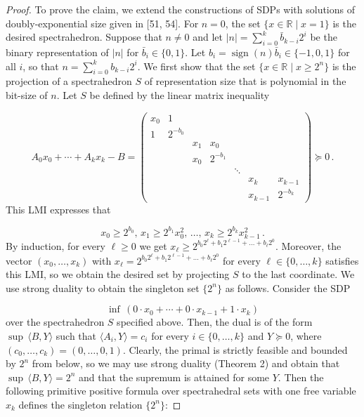\begin{proof}
To prove the claim, we extend the constructions of SDPs with solutions of doubly-exponential size given in [51, 54]. For $n=0$, the set $\{x\in\mathbb{R}\mid x=1\}$ is the desired spectrahedron. Suppose that $n\neq 0$ and let $|n|=\sum_{i=0}^{k}\bar{b}_{k-i}2^{i}$ be the binary representation of $|n|$ for $\bar{b}_{i}\in\{0,1\}$. Let $b_{i}=\operatorname*{\mathrm{sign}}(n)\bar{b}_{i}\in\{-1,0,1\}$ for all $i$, so that $n=\sum_{i=0}^{k}b_{k-i}2^{i}$. We first show that the set $\{x\in{\mathbb{R}}\mid x\geq 2^{n}\}$ is the projection of a spectrahedron $S$ of representation size that is polynomial in the bit-size of $n$. Let $S$ be defined by the linear matrix inequality


\[
\displaystyle A_{0}x_{0}+\cdots+A_{k}x_{k}-B=\begin{pmatrix}x_{0}&1&\\ 1&2^{-b_{0}}\\ &&x_{1}&x_{0}\\ &&x_{0}&2^{-b_{1}}\\ &&&&\ddots\\ &&&&&x_{k}&x_{k-1}\\ &&&&&x_{k-1}&2^{-b_{k}}\end{pmatrix}\succeq 0\,.
\]
This LMI expresses that


\[
x_{0}\geq 2^{b_{0}},\,x_{1}\geq 2^{b_{1}}x_{0}^{2},\,\dots,\,x_{k}\geq 2^{b_{k}}x_{k-1}^{2}\,.
\]
By induction, for every $\ell\geq 0$ we get $x_{\ell}\geq 2^{b_{0}2^{\ell}+b_{1}2^{\ell-1}+\dots+b_{\ell}2^{0}}$. Moreover, the vector $(x_{0},\dots,x_{k})$ with $x_{\ell}=2^{b_{0}2^{\ell}+b_{1}2^{\ell-1}+\dots+b_{\ell}2^{0}}$ for every $\ell\in\{0,\dots,k\}$ satisfies this LMI, so we obtain the desired set by projecting $S$ to the last coordinate. We use strong duality to obtain the singleton set $\{2^{n}\}$ as follows. Consider the SDP


\[
\inf\,(0\cdot x_{0}+\cdots+0\cdot x_{k-1}+1\cdot x_{k})
\]
over the spectrahedron $S$ specified above. Then, the dual is of the form $\sup\,\langle B,Y\rangle$ such that $\langle A_{i},Y\rangle=c_{i}$ for every $i\in\{0,\dots,k\}$ and $Y\succeq 0$, where $(c_{0},\dots,c_{k})=(0,\dots,0,1)$. Clearly, the primal is strictly feasible and bounded by $2^{n}$ from below, so we may use strong duality (Theorem 2) and obtain that $\sup\,\langle B,Y\rangle=2^{n}$ and that the supremum is attained for some $Y$. Then the following primitive positive formula over spectrahedral sets with one free variable $x_{k}$ defines the singleton relation $\{2^{n}\}$:



\end{proof}
